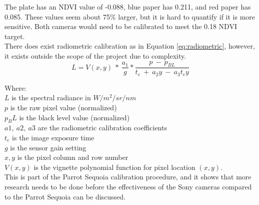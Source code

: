 The plate has an NDVI value of -0.088, blue paper has 0.211, and red paper has 0.085. These values seem about 75\% larger, but it is hard to quantify if it is more sensitive. Both cameras would need to be calibrated to meet the 0.18 NDVI target.\\

There does exist radiometric calibration as in Equation \ref{eq:radiometric}, however, it exists outside the scope of the project due to complexity.\\

\begin{equation}\label{eq:radiometric}
L = V(x,y)\ *\ \frac{a_1}{g}*\frac{p\ -\ p_{BL}}{t_e\ +\ a_2y\ -\ a_3t_ey}
\end{equation}

 

Where:\\
$L$ is the spectral radiance in $W/m^2/sr/nm$\\
$p$ is the raw pixel value (normalized)\\
$p_BL$ is the black level value (normalized)\\
$a1,\ a2,\ a3$ are the radiometric calibration coefficients\\
$t_e$ is the image exposure time\\
$g$ is the sensor gain setting\\
$x, y$ is the pixel column and row number\\
$V(x, y)$ is the vignette polynomial function for pixel location $(x, y)$.\\

This is part of the Parrot Sequoia calibration procedure, and it shows that more research needs to be done before the effectiveness of the Sony cameras compared to the Parrot Sequoia can be discussed.